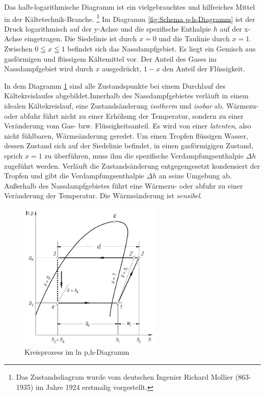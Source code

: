 Das halb-logarithmische Diagramm ist ein vielgebrauchtes und hilfreiches Mittel in der Kältetechnik-Branche. 
\footnote{Das Zustandsdiagram wurde vom deutschen Ingenier Richard Mollier (863-1935) im Jahre 1924 erstmalig vorgestellt.} 
Im Diagramm \ref{fig:Schema p-h-Diagramm} ist der Druck logarithmisch auf der y-Achse und die spezifische Enthalpie $h$ auf der x-Achse eingetragen. Die Siedelinie ist durch $x = 0$ und die Taulinie durch $x = 1$. Zwischen $0\leqq x\leqq 1$ befindet sich das Nassdampfgebiet. Es liegt ein Gemisch aus gasförmigen und flüssigem Kältemittel vor. Der Anteil des Gases im Nassdampfgebiet wird durch $x$ ausgedrückt, $1-x$ den Anteil der Flüssigkeit.


In dem Diagramm \ref{fig:Komponeneten und p-h-Diagramm} sind alle Zustandspunkte bei einem Durchlauf des Kältekreislaufes abgebildet.Innerhalb des Nassdampfgebietes verläuft in einem idealen Kältekreislauf, eine Zustandsänderung \textit{isotherm} und \textit{isobar} ab. Wärmezu- oder abfuhr führt nicht zu einer Erhöhung der Temperatur, sondern zu einer Veränderung vom Gas- bzw. Flüssigkeitsanteil. Es wird von einer \textit{latenten}, also nicht fühlbaren,  Wärmeänderung geredet. Um einen Tropfen flüssigen Wasser, dessen Zustand sich auf der Siedelinie befindet, in einen gasförmigigen Zustand, sprich $x=1$ zu überführen, muss ihm die spezifische Verdampfungsenthalpie $\Delta h$ zugeführt werden. Verläuft die Zustandsänderung entgegengesetzt kondensiert der Tropfen und gibt die Verdampfungsenthalpie $\Delta h$ an seine Umgebung ab. 
Außerhalb des Nassdampfgebietes führt eine Wärmezu- oder abfuhr zu einer Veränderung der Temperatur. Die Wärmeänderung ist \textit{sensibel}. 

\begin{figure}[htb]
\centering		
\includegraphics[width=0.6\textwidth]{Pictures/log_p_h_Beahr.png}
\caption{Kreisprozess im ln p,h-Diagramm \citep{Baehr2013}}
\label{fig:Komponeneten und p-h-Diagramm}
\end{figure}



